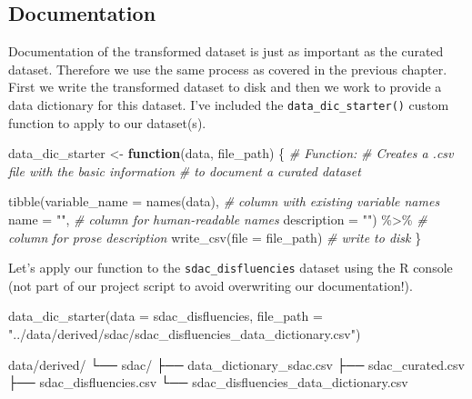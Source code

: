 \documentclass[
]{article}
\newenvironment{Shaded}{\begin{snugshade}}{\end{snugshade}}
\newcommand{\AttributeTok}[1]{\textcolor[rgb]{0.77,0.63,0.00}{#1}}
\newcommand{\CommentTok}[1]{\textcolor[rgb]{0.56,0.35,0.01}{\textit{#1}}}
\newcommand{\ControlFlowTok}[1]{\textcolor[rgb]{0.13,0.29,0.53}{\textbf{#1}}}
\newcommand{\ExtensionTok}[1]{#1}
\newcommand{\FunctionTok}[1]{\textcolor[rgb]{0.00,0.00,0.00}{#1}}
\newcommand{\NormalTok}[1]{#1}
\newcommand{\OtherTok}[1]{\textcolor[rgb]{0.56,0.35,0.01}{#1}}
\newcommand{\SpecialCharTok}[1]{\textcolor[rgb]{0.00,0.00,0.00}{#1}}
\newcommand{\StringTok}[1]{\textcolor[rgb]{0.31,0.60,0.02}{#1}}
\begin{document}
\hypertarget{documentation-3}{%
\subsection{Documentation}\label{documentation-3}}

Documentation of the transformed dataset is just as important as the curated dataset. Therefore we use the same process as covered in the previous chapter. First we write the transformed dataset to disk and then we work to provide a data dictionary for this dataset. I've included the \texttt{data\_dic\_starter()} custom function to apply to our dataset(s).

\begin{Shaded}
\begin{Highlighting}[]
\NormalTok{data\_dic\_starter }\OtherTok{\textless{}{-}} \ControlFlowTok{function}\NormalTok{(data, file\_path) \{}
  \CommentTok{\# Function:}
  \CommentTok{\# Creates a .csv file with the basic information}
  \CommentTok{\# to document a curated dataset}
  
  \FunctionTok{tibble}\NormalTok{(}\AttributeTok{variable\_name =} \FunctionTok{names}\NormalTok{(data), }\CommentTok{\# column with existing variable names }
       \AttributeTok{name =} \StringTok{""}\NormalTok{, }\CommentTok{\# column for human{-}readable names}
       \AttributeTok{description =} \StringTok{""}\NormalTok{) }\SpecialCharTok{\%\textgreater{}\%} \CommentTok{\# column for prose description}
  \FunctionTok{write\_csv}\NormalTok{(}\AttributeTok{file =}\NormalTok{ file\_path) }\CommentTok{\# write to disk}
\NormalTok{\}}
\end{Highlighting}
\end{Shaded}

Let's apply our function to the \texttt{sdac\_disfluencies} dataset using the R console (not part of our project script to avoid overwriting our documentation!).

\begin{Shaded}
\begin{Highlighting}[]
\FunctionTok{data\_dic\_starter}\NormalTok{(}\AttributeTok{data =}\NormalTok{ sdac\_disfluencies, }\AttributeTok{file\_path =} \StringTok{"../data/derived/sdac/sdac\_disfluencies\_data\_dictionary.csv"}\NormalTok{)}
\end{Highlighting}
\end{Shaded}

\begin{Shaded}
\begin{Highlighting}[]
\ExtensionTok{data/derived/}
\ExtensionTok{└──}\NormalTok{ sdac/}
    \ExtensionTok{├──}\NormalTok{ data\_dictionary\_sdac.csv}
    \ExtensionTok{├──}\NormalTok{ sdac\_curated.csv}
    \ExtensionTok{├──}\NormalTok{ sdac\_disfluencies.csv}
    \ExtensionTok{└──}\NormalTok{ sdac\_disfluencies\_data\_dictionary.csv}
\end{Highlighting}
\end{Shaded}
\end{document}
